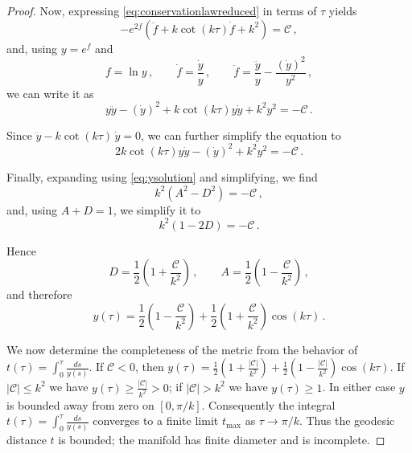 \documentclass[12pt,a4paper,reqno]{amsart}
\theoremstyle{plain}
\theoremstyle{remark}
\numberwithin{equation}{section}
\newcommand{\cC}{\mathcal{C}}
\begin{document}
\begin{proof}
Now, expressing \eqref{eq:conservationlawreduced} in terms of $\tau$ yields
\begin{equation*}
- e^{2f}\left(\ddot{f} + k\cot(k\tau)\dot{f} + k^2\right) = \cC \,,
\end{equation*}
and, using $y=e^f$ and
\begin{equation*}
f = \ln y \,, \qquad \dot{f} = \frac{\dot{y}}{y} \,, \qquad \ddot{f} = \frac{\ddot{y}}{y} - \frac{(\dot{y})^2}{y^2} \,,
\end{equation*}
we can write it as
\begin{equation*}
y\ddot{y} - (\dot{y})^2 + k\cot(k\tau)y\dot{y} + k^2y^2 = - \cC \,.
\end{equation*}

Since $\ddot{y} - k\cot(k\tau)\,\dot{y} = 0$, we can further simplify the equation to
\begin{equation*}
2k\cot(k\tau)y\dot{y} - (\dot{y})^2 + k^2y^2 = - \cC \,.
\end{equation*}

Finally, expanding using \eqref{eq:ysolution} and simplifying, we find
\begin{equation*}
k^2(A^2 - D^2) = - \cC \,,
\end{equation*}
and, using $A+D=1$, we simplify it to
\begin{equation}\label{eq:Dcondition}
k^2(1 - 2D) = - \cC \,.
\end{equation}

Hence
\begin{equation*}
D = \frac12\left(1 + \frac{\cC}{k^2}\right) \,, \qquad A = \frac12\left(1 - \frac{\cC}{k^2}\right) \,,
\end{equation*}
and therefore
\begin{equation}\label{eq:ysolutionfinal}
y(\tau) = \frac12\left(1-\frac{\cC}{k^2}\right) + \frac12\left(1+\frac{\cC}{k^2}\right)\cos(k\tau) \,.
\end{equation}

We now determine the completeness of the metric from the behavior of $t(\tau) = \int_0^\tau \frac{ds}{y(s)}$. If $\cC < 0$, then $y(\tau)=\tfrac12\left(1+\frac{|\cC|}{k^2}\right) + \tfrac12\left(1-\frac{|\cC|}{k^2}\right)\cos(k\tau)$. If $|\cC|\le k^2$ we have $y(\tau)\ge \frac{|\cC|}{k^2}>0$; if $|\cC|>k^2$ we have $y(\tau)\ge1$. In either case $y$ is bounded away from zero on $[0,\pi/k]$. Consequently the integral $t(\tau) = \int_0^\tau \frac{ds}{y(s)}$ converges to a finite limit $t_{\max}$ as $\tau\to\pi/k$. Thus the geodesic distance $t$ is bounded; the manifold has finite diameter and is incomplete.


\end{proof}
\end{document}
